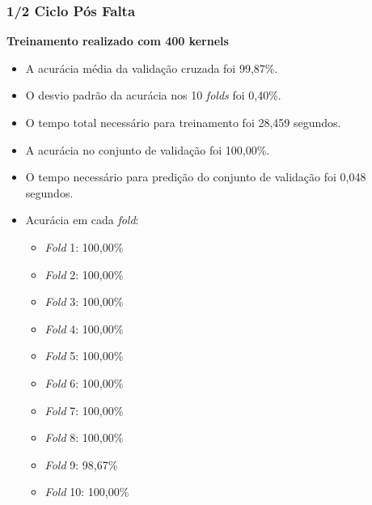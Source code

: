 \subsubsection{1/2 Ciclo Pós Falta}
\textbf{Treinamento realizado com 400 kernels}
\begin{itemize}
    \item A acurácia média da validação cruzada foi 99,87\%.
    \item O desvio padrão da acurácia nos 10 \textit{folds} foi 0,40\%.
    \item O tempo total necessário para treinamento foi 28,459 segundos.
    \item A acurácia no conjunto de validação foi 100,00\%.
    \item O tempo necessário para predição do conjunto de validação foi 0,048 segundos.
    \item Acurácia em cada \textit{fold}:
    \begin{itemize}
        \item \textit{Fold} 1: 100,00\%
        \item \textit{Fold} 2: 100,00\%
        \item \textit{Fold} 3: 100,00\%
        \item \textit{Fold} 4: 100,00\%
        \item \textit{Fold} 5: 100,00\%
        \item \textit{Fold} 6: 100,00\%
        \item \textit{Fold} 7: 100,00\%
        \item \textit{Fold} 8: 100,00\%
        \item \textit{Fold} 9: 98,67\%
        \item \textit{Fold} 10: 100,00\%
    \end{itemize}
\end{itemize}


